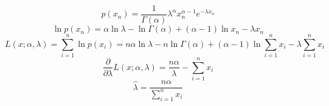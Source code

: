 \documentclass[a4paper]{article}
\begin{document}
\begin{enumerate}
		\begin{solution}
			\begin{equation*}
			p(x_n) = \frac{1}{\Gamma (\alpha)}\lambda^\alpha x_n^{\alpha -  1}e^{-\lambda x_n}
			\end{equation*}
			\begin{equation*}
			\ln p(x_n) = \alpha \ln \lambda - \ln \Gamma (\alpha) + (\alpha - 1)\ln x_n - \lambda x_n
			\end{equation*}
			\begin{equation*}
				L(x;\alpha,\lambda) = \sum_{i = 1}^{n} \ln p(x_i)=n\alpha \ln \lambda - n \ln \Gamma (\alpha) + (\alpha - 1)\ln \sum_{i = 1}^{n}x_i - \lambda \sum_{i = 1}^{n} x_i
			\end{equation*}
			\begin{equation*}
				\frac{\partial}{\partial \lambda}L(x;\alpha,\lambda)=\frac{n\alpha}{\lambda}-\sum_{i = 1}^{n} x_i
			\end{equation*}
			\begin{equation*}
				\hat{\lambda} = \frac{n\alpha}{\sum_{i = 1}^{n} x_i}
			\end{equation*}
		\end{solution}
	\end{enumerate}
\end{document}
